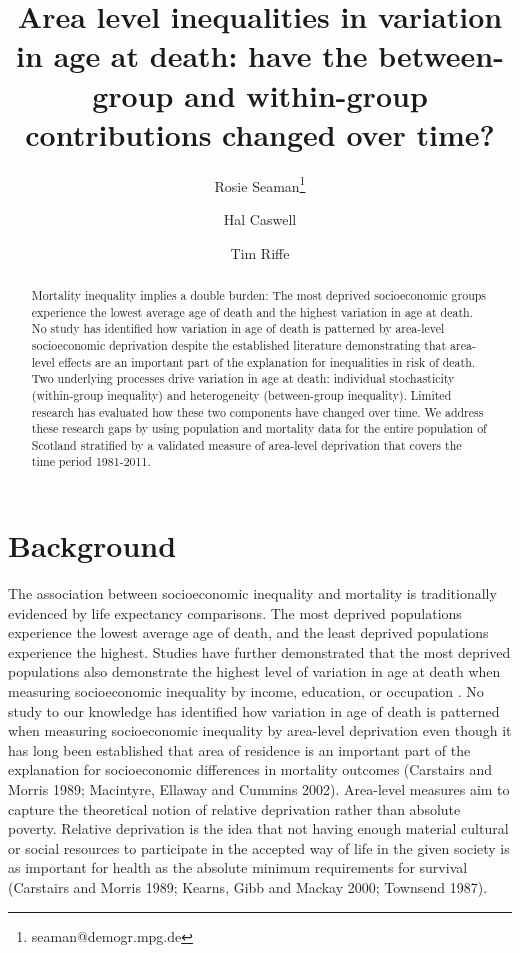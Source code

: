 \documentclass[12pt,oneside,a4paper]{article} %
\theoremstyle{definition}
\begin{document}
\title{Area level inequalities in variation in age at death: have the between-group and within-group contributions changed over time?}
\author[1]{Rosie Seaman\thanks{seaman@demogr.mpg.de}}
\author[2]{Hal Caswell}
\author[1]{Tim Riffe}


\maketitle

\begin{abstract}
Mortality inequality implies a double burden: The most deprived socioeconomic
groups experience the lowest average age of death and the highest variation in age at death. No study has identified how variation in age of death is patterned by area-level socioeconomic deprivation despite the established literature demonstrating that area-level effects are an important part of the explanation for inequalities in risk of death. Two underlying processes drive variation in age at death: individual stochasticity (within-group inequality) and heterogeneity (between-group inequality). Limited research has evaluated how these two components have changed over time. We address these research gaps by using population and mortality data for the entire population of Scotland stratified by a validated measure of area-level deprivation that covers the time period 1981-2011.
\end{abstract}

\section{Background}
The association between socioeconomic inequality and mortality is traditionally
evidenced by life expectancy comparisons. The most deprived populations
experience the lowest average age of death, and the least deprived populations
experience the highest. Studies have further demonstrated that the most deprived
populations also demonstrate the highest level of variation in age at death when
measuring socioeconomic inequality by income, education, or occupation
\citep{bronnum2007increasing, vaupel2011life, van2014lifespan,
sasson2016trends}. No study to our knowledge has identified how variation in age
of death is patterned when measuring socioeconomic inequality by area-level deprivation even though it has long been established that area of residence is an important part of the explanation for socioeconomic differences in mortality outcomes (Carstairs and Morris 1989; Macintyre, Ellaway and Cummins 2002). Area-level measures aim to capture the theoretical notion of relative deprivation rather than absolute poverty. Relative deprivation is the idea that not having enough material cultural or social resources to participate in the accepted way of life in the given society is as important for health as the absolute minimum requirements for survival (Carstairs and Morris 1989; Kearns, Gibb and Mackay 2000; Townsend 1987).
 
\end{document}
